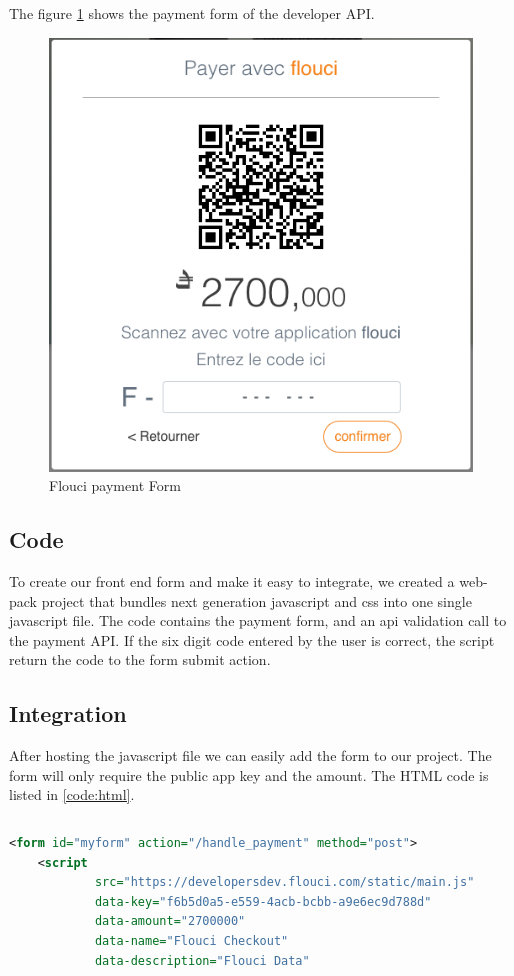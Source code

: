 \begin{spacing}{1.2}
The figure \ref{fig:onlinepay} shows the payment form of the developer API.
\begin{figure}[H]\centering
\includegraphics[scale=0.5]{payment_form.png}
\caption{Flouci payment Form}
\label{fig:onlinepay}
\end{figure}

\subsection{Code}
To create our front end form and make it easy to integrate, we created a web-pack project that bundles next generation javascript and css into one single javascript file.
The code contains the payment form, and an api validation call to the payment API.
If the six digit code entered by the user is correct, the script return the code to the form submit action.
\subsection{Integration}
After hosting the javascript file we can easily add the form to our project. The form will only require the public app key  and the amount.
The HTML code is listed in \ref{code:html}.
\begin{lstlisting}[rulecolor=\color{white}]
\end{lstlisting}
\begin{lstlisting}[label=code:html,caption=Flouci Integration Java,language=xml]
 <form id="myform" action="/handle_payment" method="post">
    <script
            src="https://developersdev.flouci.com/static/main.js"
            data-key="f6b5d0a5-e559-4acb-bcbb-a9e6ec9d788d"
            data-amount="2700000"
            data-name="Flouci Checkout"
            data-description="Flouci Data"


\end{lstlisting}
\end{spacing}
